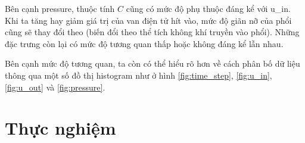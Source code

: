 \documentclass{article}
\begin{document}
Bên cạnh pressure, thuộc tính $C$ cũng có mức độ phụ thuộc đáng kể với u\_in. Khi ta tăng hay giảm giá trị của van điện tử hít vào, mức độ giãn nỡ của phổi cũng sẽ thay đổi theo (biến đổi theo thể tích không khí truyền vào phổi). Những đặc trưng còn lại có mức độ tương quan thấp hoặc không đáng kể lẫn nhau. 

Bên cạnh mức độ tương quan, ta còn có thể hiểu rõ hơn về cách phân bố dữ liệu thông qua một số đồ thị histogram như ở hình \ref{fig:time_step}, \ref{fig:u_in}, \ref{fig:u_out} và \ref{fig:pressure}.




\section{Thực nghiệm}

\end{document}
